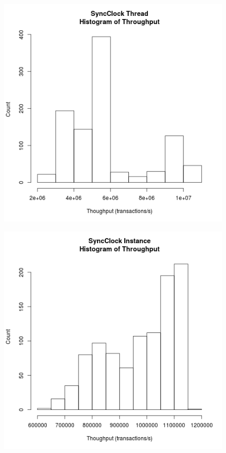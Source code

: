 \clearpage
\begin{figure}
\center
\includegraphics[height=.25\textheight]{sync_thread_throughput_hist.png}
\caption{\label{sync_thread_throughput}}
\end{figure}

\begin{figure}
\center
\includegraphics[height=.25\textheight]{sync_instance_throughput_hist.png}
\caption{\label{sync_instance_throughput}}
\end{figure}

